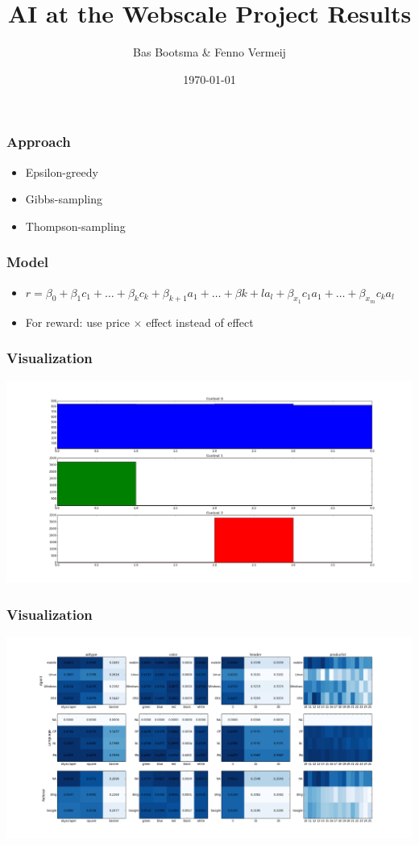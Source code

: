 \documentclass{beamer}
\title[AI@Webscale Presentation]{
  AI at the Webscale Project Results}
\author[Bas Bootsma, Fenno Vermeij]{Bas Bootsma \& Fenno Vermeij}
\institute[Radboud University Nijmegen]{Radboud University Nijmegen}
\date{\today}
\begin{document}
\begin{frame}
  \titlepage
\end{frame}

\begin{frame}
	\frametitle{Approach}	
	\begin{itemize}
		\item Epsilon-greedy
		\item Gibbs-sampling
		\item Thompson-sampling
	\end{itemize}
\end{frame}

\begin{frame}
	\frametitle{Model}
	\begin{itemize}
		\item $r = \beta_0 + \beta_1 c_1 + \ldots + \beta_k c_k + \beta_{k+1} a_1 + \ldots + \beta {k+l} a_l + \beta_{x_1} c_1a_1 + \ldots + \beta_{x_m} c_ka_l$
		\item For reward: use price $\times$ effect instead of effect
	\end{itemize}
\end{frame}

\begin{frame}
	\frametitle{Visualization}
	\includegraphics[width=\textwidth]{test.png}
\end{frame}

\begin{frame}
	\frametitle{Visualization}
	\includegraphics[width=\textwidth]{viewer.png}
\end{frame}
\end{document}
